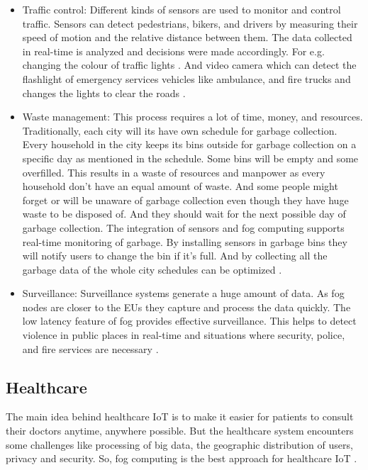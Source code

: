 \begin{itemize}
    \item Traffic control: Different kinds of sensors are used to monitor and control traffic. Sensors can detect pedestrians, bikers, and drivers by measuring their speed of motion and the relative distance between them. The data collected in real-time is analyzed and decisions were made accordingly. For e.g. changing the colour of traffic lights \cite{sandra}. And video camera which can detect the flashlight of emergency services vehicles like ambulance, and fire trucks and changes the lights to clear the roads \cite{waheetha2016fog}.
    \item Waste management: This process requires a lot of time, money, and resources. Traditionally, each city will its have own schedule for garbage collection. Every household in the city keeps its bins outside for garbage collection on a specific day as mentioned in the schedule. Some bins will be empty and some overfilled. This results in a waste of resources and manpower as every household don't have an equal amount of waste. And some people might forget or will be unaware of garbage collection even though they have huge waste to be disposed of. And they should wait for the next possible day of garbage collection. The integration of sensors and fog computing supports real-time monitoring of garbage. By installing sensors in garbage bins they will notify users to change the bin if it's full. And by collecting all the garbage data of the whole city schedules can be optimized \cite{sandra}.
    \item Surveillance: Surveillance systems generate a huge amount of data. As fog nodes are closer to the EUs they capture and process the data quickly. The low latency feature of fog provides effective surveillance. This helps to detect violence in public places in real-time and situations where security, police, and fire services are necessary \cite{sandra}.
\end{itemize}


\subsection{Healthcare}

The main idea behind healthcare IoT is to make it easier for patients to consult their doctors anytime, anywhere possible. But the healthcare system encounters some challenges like processing of big data, the geographic distribution of users, privacy and security. So, fog computing is the best approach for healthcare IoT \cite{jennifer}. \par

